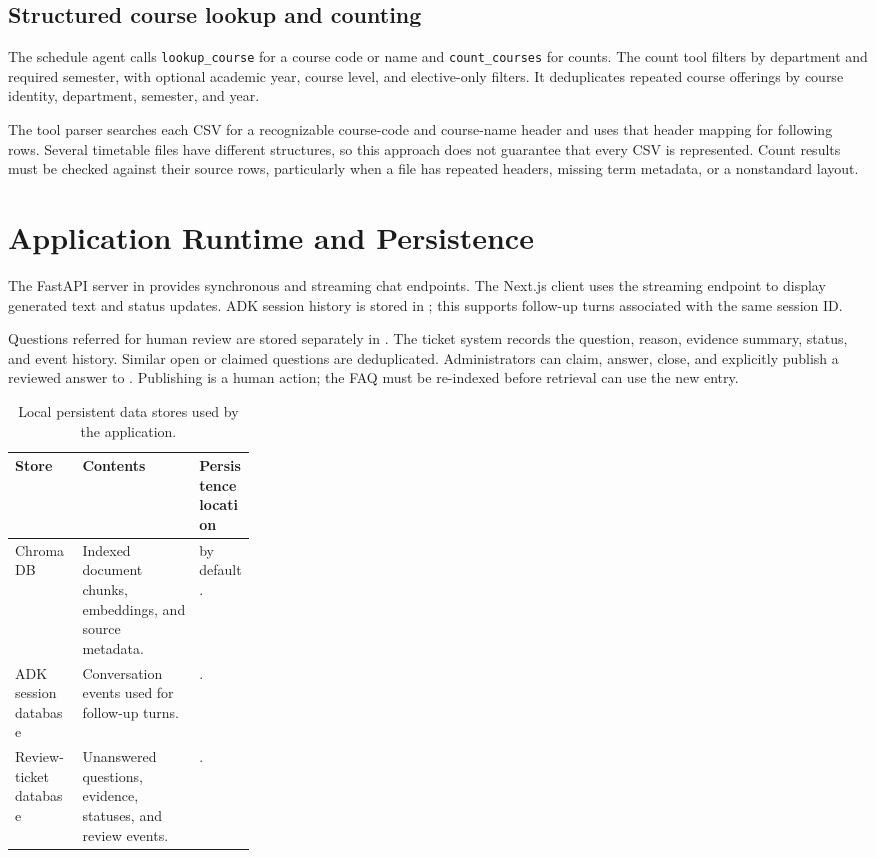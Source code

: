 \documentclass[11pt,a4paper]{article}
\begin{document}
\subsection{Structured course lookup and counting}
The schedule agent calls \texttt{lookup\_course} for a course code or name and \texttt{count\_courses} for counts. The count tool filters by department and required semester, with optional academic year, course level, and elective-only filters. It deduplicates repeated course offerings by course identity, department, semester, and year.

The tool parser searches each CSV for a recognizable course-code and course-name header and uses that header mapping for following rows. Several timetable files have different structures, so this approach does not guarantee that every CSV is represented. Count results must be checked against their source rows, particularly when a file has repeated headers, missing term metadata, or a nonstandard layout.

\section{Application Runtime and Persistence}
The FastAPI server in  provides synchronous and streaming chat endpoints. The Next.js client uses the streaming endpoint to display generated text and status updates. ADK session history is stored in ; this supports follow-up turns associated with the same session ID.

Questions referred for human review are stored separately in . The ticket system records the question, reason, evidence summary, status, and event history. Similar open or claimed questions are deduplicated. Administrators can claim, answer, close, and explicitly publish a reviewed answer to . Publishing is a human action; the FAQ must be re-indexed before retrieval can use the new entry.

\begin{table}[htbp]
\centering
\small
\begin{tabularx}{0.92\linewidth}{@{}L{0.28\linewidth}YY@{}}
\toprule
\textbf{Store} & \textbf{Contents} & \textbf{Persistence location}\\
\midrule
ChromaDB & Indexed document chunks, embeddings, and source metadata. &  by default.\\
ADK session database & Conversation events used for follow-up turns. & .\\
Review-ticket database & Unanswered questions, evidence, statuses, and review events. & .\\
\bottomrule
\end{tabularx}
\caption{Local persistent data stores used by the application.}
\label{tab:stores}
\end{table}
\end{document}
